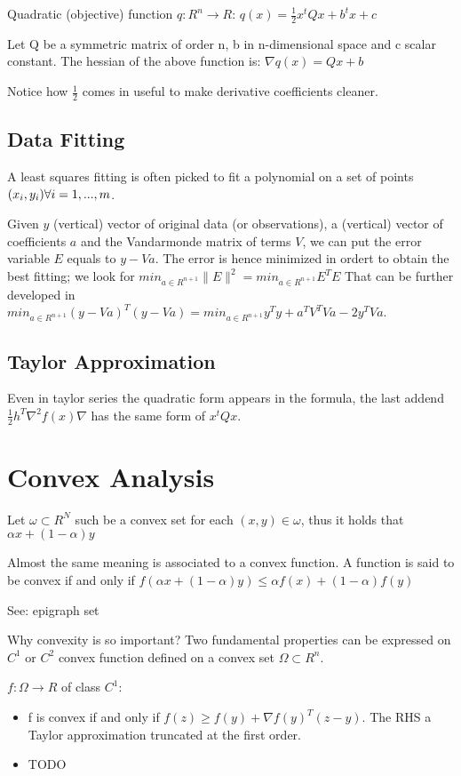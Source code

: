 Quadratic (objective) function $q: R^n \rightarrow R$:
$q(x) = \frac{1}{2}x^t Q x + b^t x + c$

Let Q be a symmetric matrix of order n, b in n-dimensional space and c scalar constant.
The hessian of the above function is: $\nabla q(x) = Qx + b$

Notice how $\frac{1}{2}$ comes in useful to make derivative coefficients cleaner.

\subsection{Data Fitting}
A least squares fitting is often picked to fit a polynomial on a set of points $(x_i, y_i) \space \forall i=1,...,m$.

Given $y$ (vertical) vector of original data (or observations), a (vertical) vector of coefficients $a$ and the Vandarmonde matrix of terms $V$, we can put the error variable $E$ equals to $y-Va$.
The error is hence minimized in ordert to obtain the best fitting; we look for $min_{a \in R^{n+1}} \|E\|^2 = min_{a \in R^{n+1}} E^T E$
That can be further developed in $min_{a \in R^{n+1}} (y-Va)^T (y-Va) = min_{a \in R^{n+1}} y^T y + a^T V^T V a - 2y^TVa$.

\subsection{Taylor Approximation}
Even in taylor series the quadratic form appears in the formula, the last addend $\frac{1}{2} h^T \nabla^2 f(x) \nabla$ has the same form of $x^t Q x$.

\section{Convex Analysis}
Let $\omega \subset R^N$ such be a convex set for each $(x, y) \in \omega$, thus it holds that $\alpha x + ( 1 - \alpha ) y$

Almost the same meaning is associated to a convex function. A function is said to be convex if and only if $f(\alpha x + ( 1 - \alpha ) y) \leq \alpha f(x) + ( 1 - \alpha ) f(y)$

See: epigraph set

Why convexity is so important? Two fundamental properties can be expressed on $C^1$ or $C^2$ convex function defined on a convex set $\Omega \subset R^n$.

$f: \Omega \rightarrow R$ of class $C^1$:
\begin{itemize}
  \item f is convex if and only if $f(z) \geq f(y) + \nabla f(y)^T (z-y)$. The RHS a Taylor approximation truncated at the first order.
  \item TODO
\end{itemize}

